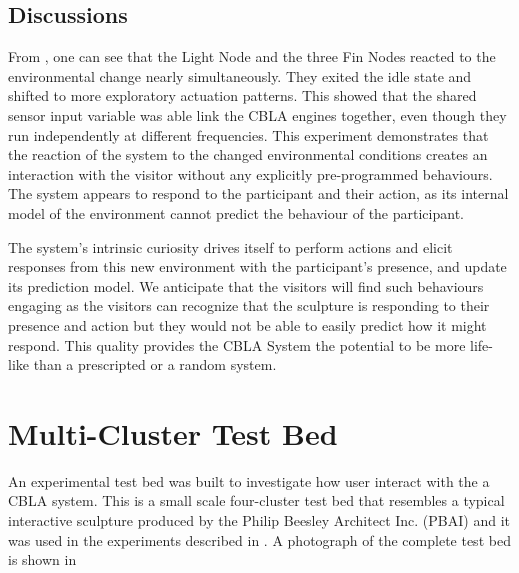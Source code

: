 \subsection{Discussions}

From , one can see that the Light Node and the three Fin Nodes reacted to the environmental change nearly simultaneously. They exited the idle state and shifted to more exploratory actuation patterns. This showed that the shared sensor input variable was able link the CBLA engines together, even though they run independently at different frequencies. This experiment demonstrates that the reaction of the system to the changed environmental conditions creates an interaction with the visitor without any explicitly pre-programmed behaviours. The system appears to respond to the participant and their action, as its internal model of the environment cannot predict the behaviour of the participant. 

The system's intrinsic curiosity drives itself to perform actions and elicit responses from this new environment with the participant's presence, and update its prediction model. We anticipate that the visitors will find such behaviours engaging as the visitors can recognize that the sculpture is responding to their presence and action but they would not be able to easily predict how it might respond. This quality provides the CBLA System the potential to be more life-like than a prescripted or a random system. 


\section{Multi-Cluster Test Bed}\label{sec:multi-cluster-test-bed}

An experimental test bed was built to investigate how user interact with the a CBLA system. This is a small scale four-cluster test bed that resembles a typical interactive sculpture produced by the Philip Beesley Architect Inc. (PBAI) and it was used in the experiments described in . A photograph of the complete test bed is shown in 

